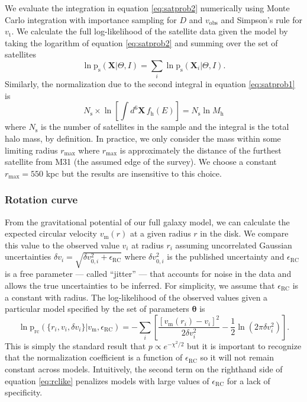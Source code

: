 \documentclass[preprint]{aastex}
\newcommand{\eqlabel}[1]{\label{eq:#1}}
\newcommand{\eq}[1]{equation \ref{eq:#1}}
\begin{document}
We evaluate the integration in \eq{satprob2}  numerically using Monte
Carlo integration with importance sampling for $D$ and $v_\mathrm{obs}$ and
Simpson's rule for $v_{\mathrm{t}}$.  We calculate the full log-likelihood of the
satellite data given the model by taking the logarithm of \eq{satprob2}
and summing over the set of satellites
\begin{equation}
    \ln \mathrm{p}_\mathrm{s} (\mathbf{X}| \Theta, I)
    = \sum_i \ln \mathrm{p}_\mathrm{s} (\mathbf{X}_i | \Theta,I).
\end{equation}
Similarly, the normalization due to the second integral in \eq{satprob1} is
\begin{equation}
    \eqlabel{satnorm}
    N_\mathrm{s} \times
        \ln \left [ \int d^6 \mathbf{X} \, f_\mathrm{h} (E) \right ] =
        N_\mathrm{s} \ln M_\mathrm{h}
\end{equation}
where $N_\mathrm{s}$ is the number of satellites in the sample and the integral
is the total halo mass, by definition.  In practice, we only consider the mass
within some limiting radius $r_\mathrm{max}$ where $r_\mathrm{max}$ is approximately
the distance of the furthest satellite from M31 (the assumed edge of the survey).
We choose a constant $r_\mathrm{max} = 550$ kpc but the results are insensitive
to this choice.

\subsubsection{Rotation curve}

From the gravitational potential of our full galaxy model, we can calculate the
expected circular velocity $v_\mathrm{m}(r)$ at a given radius $r$ in the disk.
We compare this value to the observed value $v_i$ at radius $r_i$ assuming
uncorrelated Gaussian uncertainties
$\delta v_i = \sqrt{\delta v_{0,i}^2 + \epsilon_\mathrm{RC}}$ where
$\delta v_{0,i}^2$ is the published uncertainty and $\epsilon_\mathrm{RC}$ is a
free parameter --- called ``jitter'' --- that accounts for noise in the data and
allows the true uncertainties to be inferred.  For simplicity, we assume that
$\epsilon_\mathrm{RC}$ is a constant with radius.  The log-likelihood of the
observed values given a particular model specified by the set of parameters
$\mathbf{\theta}$ is
\begin{equation}
    \eqlabel{rclike}
    \ln \mathrm{p}_\mathrm{rc} (\{ r_i, v_i, \delta v_i \}| v_\mathrm{m},
    \epsilon_\mathrm{RC}) = - \sum_i \left [ \frac{[v_\mathrm{m}(r_i) - v_i]^2}
        {2 \delta v_i ^2} - \frac{1}{2} \ln (2 \pi \delta v_i ^2) \right ].
\end{equation}
This is simply the standard result that $p \propto e^{-\chi^2/2}$ but it is
important to recognize that the normalization coefficient is a function of
$\epsilon_\mathrm{RC}$ so it will not remain constant across models.
Intuitively, the second term on the righthand side of \eq{rclike} penalizes
models with large values of $\epsilon_\mathrm{RC}$ for a lack of specificity.
\end{document}
